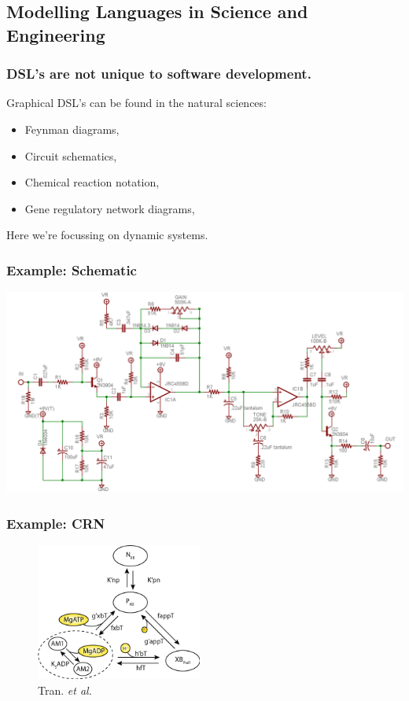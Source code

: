 \documentclass[11pt,reqno]{beamer}
\begin{document}
\subsection{Modelling Languages in Science and Engineering}
\begin{frame}
\frametitle{DSL's are not unique to software development.}
Graphical DSL's can be found in the natural sciences:
\begin{itemize}
	\item Feynman diagrams,
	\item Circuit schematics,
	\item Chemical reaction notation,
	\item Gene regulatory network diagrams,
\end{itemize}

Here we're focussing on dynamic systems.\\

\end{frame}

\begin{frame}
\frametitle{Example: Schematic}
\includegraphics[width=\linewidth]{images/ts808.png}
\end{frame}
\begin{frame}
\frametitle{Example: CRN}
\begin{figure}
\centering \includegraphics[height=4.5cm]{images/tran_2009.png}
\caption{Tran. \emph{et al.} \cite{Tran2009} }
\end{figure}
\end{frame}
\end{document}
